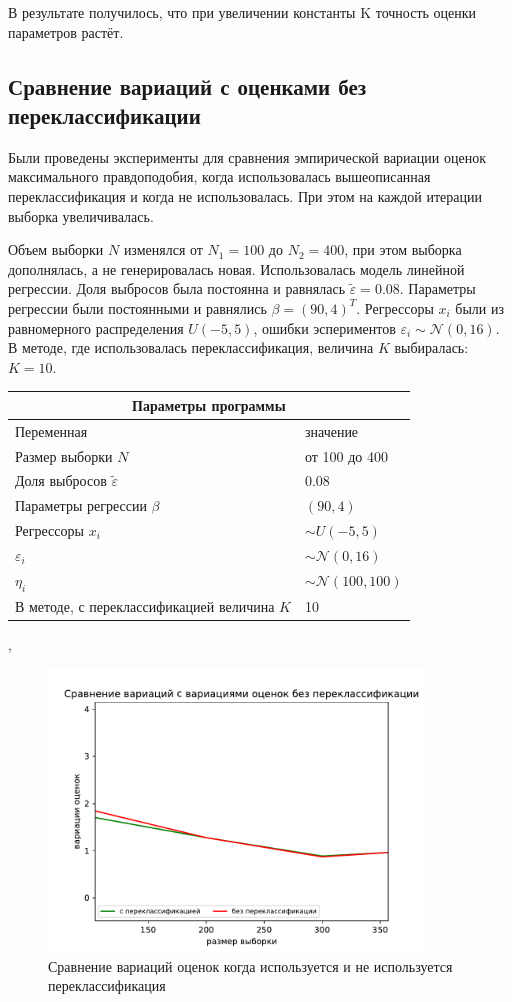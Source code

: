 В результате получилось, что при увеличении константы K точность оценки параметров растёт. 
\subsection{Сравнение вариаций с оценками без переклассификации}
Были проведены эксперименты для сравнения эмпирической вариации оценок максимального правдоподобия, когда использовалась вышеописанная переклассификация и когда не использовалась. При этом на каждой итерации выборка увеличивалась. 

Объем выборки $N$ изменялся от $N_1=100$ до $N_2=400$, при этом выборка дополнялась, а не генерировалась новая. Использовалась модель линейной регрессии. Доля выбросов была постоянна и равнялась $\widetilde{\varepsilon}=0.08$. Параметры регрессии были постоянными и равнялись $\beta=(90,4)^T$. 
Регрессоры $x_i$ были из равномерного распределения $U(-5,5)$, ошибки эспериментов $\varepsilon_i\sim \mathcal{N}(0,16)$. В методе, где использовалась переклассификация, величина $K$ выбиралась: $K=10$.
\vspace{3cm}
\begin{center}
    \label{tab1}
    \begin{tabular}{|p{5cm}|p{5cm}|}
        \hline
        \multicolumn{2}{|c|}{Параметры программы} \\
        \hline
        Переменная&значение\\
        \hline
        Размер выборки $N$& от 100 до 400\\
        \hline
        Доля выбросов $\widetilde{\varepsilon}$& 0.08\\
        \hline
        Параметры регрессии $\beta$& $(90,4)$\\
        \hline
        Регрессоры $x_i$ & $\sim U(-5,5)$\\
        \hline
        $\varepsilon_i$&$\sim \mathcal{N}(0,16)$\\
        \hline
        $\eta_i$&$\sim \mathcal{N}(100,100)$\\
        \hline
        В методе, с переклассификацией величина $K$& 10\\
        \hline
    \end{tabular},
\end{center}
\newpage
\begin{figure}[ht!]
    \centering
    \includegraphics[width=100mm]{../images/on_off_recl.pdf}
    \caption{Сравнение вариаций оценок когда используется и не используется переклассификация\label{overflow}}
    \label{pic2}
\end{figure}

\newpage
